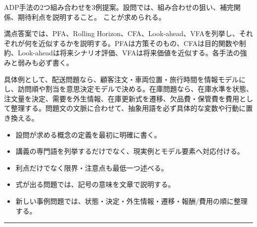 ADP手法の2つ組み合わせを3例提案。設問では、組み合わせの狙い、補完関係、期待利点を説明すること。 ことが求められる。\par
{}
満点答案では、PFA、Rolling Horizon、CFA、Look-ahead、VFAを列挙し、それぞれが何を近似するかを説明する。PFAは方策そのもの、CFAは目的関数や制約、Look-aheadは将来シナリオ評価、VFAは将来価値を近似する。各手法の強みと弱みも必ず書く。\par
{}
具体例として、配送問題なら、顧客注文・車両位置・旅行時間を情報モデルにし、訪問順や割当を意思決定モデルで決める。在庫問題なら、在庫水準を状態、注文量を決定、需要を外生情報、在庫更新式を遷移、欠品費・保管費を費用として整理する。問題文の文脈に合わせて、抽象用語を必ず具体的な変数や行動に置き換える。\par
{}
\begin{itemize}
\item 設問が求める概念の定義を最初に明確に書く。
\item 講義の専門語を列挙するだけでなく、現実例とモデル要素へ対応付ける。
\item 利点だけでなく限界・注意点も最低一つ述べる。
\item 式が出る問題では、記号の意味を文章で説明する。
\item 新しい事例問題では、状態・決定・外生情報・遷移・報酬/費用の順に整理する。
\end{itemize}
\vspace{2mm}\hrule\vspace{2mm}